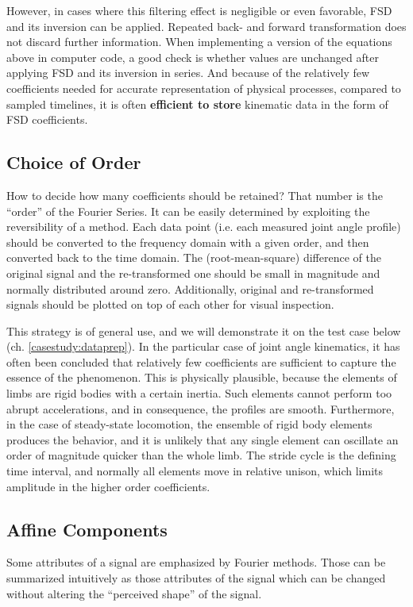 However, in cases where this filtering effect is negligible or even favorable, FSD and its inversion can be applied.
Repeated back- and forward transformation does not discard further information.
When implementing a version of the equations above in computer code, a good check is whether values are unchanged after applying FSD and its inversion in series.
And because of the relatively few coefficients needed for accurate representation of physical processes, compared to sampled timelines, it is often \textbf{efficient to store} kinematic data in the form of FSD coefficients.

\subsection{Choice of Order}
\label{sec:orgff5edd5}
How to decide how many coefficients should be retained?
That number is the ``order'' of the Fourier Series.
It can be easily determined by exploiting the reversibility of a method.
Each data point (i.e. each measured joint angle profile) should be converted to the frequency domain with a given order, and then converted back to the time domain.
The (root-mean-square) difference of the original signal and the re-transformed one should be small in magnitude and normally distributed around zero.
Additionally, original and re-transformed signals should be plotted on top of each other for visual inspection.


This strategy is of general use, and we will demonstrate it on the test case below (ch. \ref{casestudy:dataprep}).
In the particular case of joint angle kinematics, it has often been concluded that relatively few coefficients are sufficient to capture the essence of the phenomenon.
This is physically plausible, because the elements of limbs are rigid bodies with a certain inertia.
Such elements cannot perform too abrupt accelerations, and in consequence, the profiles are smooth.
Furthermore, in the case of steady-state locomotion, the ensemble of rigid body elements produces the behavior, and it is unlikely that any single element can oscillate an order of magnitude quicker than the whole limb.
The stride cycle is the defining time interval, and normally all elements move in relative unison, which limits amplitude in the higher order coefficients.


\subsection{Affine Components}
\label{sec:org05eb5a7}
Some attributes of a signal are emphasized by Fourier methods.
Those can be summarized intuitively as those attributes of the signal which can be changed without altering the ``perceived shape'' of the signal.

